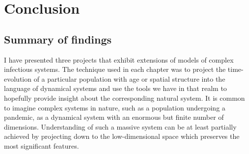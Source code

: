 
\chapter{Conclusion}

\section{Summary of findings}

I have presented three projects that exhibit extensions of models of complex infectious systems. The technique used in each chapter was to project the time-evolution of a particular population with age or spatial structure into the language of dynamical systems and use the tools we have in that realm to hopefully provide insight about the corresponding natural system. It is common to imagine complex systems in nature, such as a population undergoing a pandemic, as a dynamical system with an enormous but finite number of dimensions. Understanding of such a massive system can be at least partially achieved by projecting down to the low-dimensional space which preserves the most significant features.  


